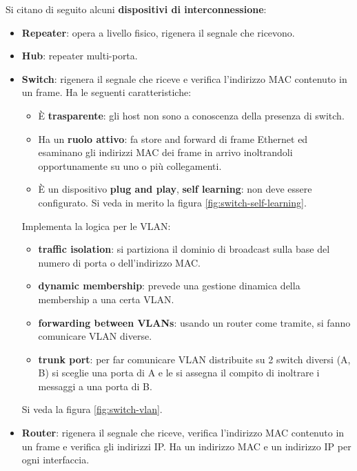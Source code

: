 \documentclass[11pt, italian, openany]{book}
\begin{document}
\begin{sloppypar}
Si citano di seguito alcuni \textbf{dispositivi di interconnessione}:
\begin{itemize}[itemsep=0pt,topsep=0pt,parsep=0pt]
	\item \textbf{Repeater}: opera a livello fisico, rigenera il segnale che ricevono.
	\item \textbf{Hub}: repeater multi-porta.
	\item \textbf{Switch}: rigenera il segnale che riceve e verifica l'indirizzo MAC contenuto in un frame. Ha le seguenti caratteristiche:
	\begin{itemize}
		\item \`E \textbf{trasparente}: gli host non sono a conoscenza della presenza di switch.
		\item Ha un \textbf{ruolo attivo}: fa store and forward di frame Ethernet ed esaminano gli indirizzi MAC dei frame in arrivo inoltrandoli
		opportunamente su uno o pi\`u collegamenti.
		\item \`E un dispositivo \textbf{plug and play}, \textbf{self learning}: non deve essere configurato. Si veda in merito la figura
		\ref{fig:switch-self-learning}.
	\end{itemize}
	Implementa la logica per le VLAN:
	\begin{itemize}
		\item \textbf{traffic isolation}: si partiziona il dominio di broadcast sulla base del numero di porta o dell'indirizzo MAC.
		\item \textbf{dynamic membership}: prevede una gestione dinamica della membership a una certa VLAN.
		\item \textbf{forwarding between VLANs}: usando un router come tramite, si fanno comunicare VLAN diverse.
		\item \textbf{trunk port}: per far comunicare VLAN distribuite su 2 switch diversi (A, B) si sceglie una porta di A e le si assegna il compito
		di inoltrare i messaggi a una porta di B.
	\end{itemize}
	Si veda la figura \ref{fig:switch-vlan}.
	\item \textbf{Router}: rigenera il segnale che riceve, verifica l'indirizzo MAC contenuto in un frame e verifica gli indirizzi IP. Ha un indirizzo MAC
	e un indirizzo IP per ogni interfaccia.
\end{itemize}

\pagebreak


\end{sloppypar}
\end{document}
